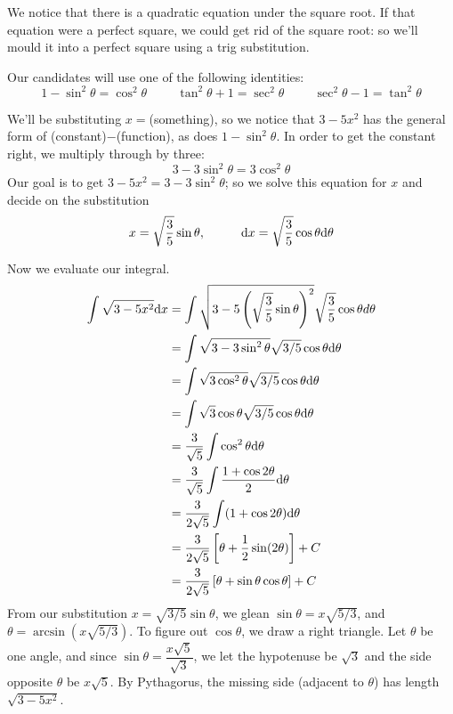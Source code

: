 \begin{solution}

We notice that there is a quadratic equation under the square root. If that equation were a perfect square, we could get rid of the square root: so we'll mould it into a perfect square using a trig substitution.

Our candidates will use one of the following identities:
\[1-\sin^2\theta=\cos^2\theta \hspace{1cm} \tan^2\theta+1=\sec^2\theta \hspace{1cm} \sec^2\theta-1=\tan^2\theta\]

We'll be substituting $x=$(something), so we notice that $3-5x^2$ has the general form of
(constant)$-$(function), as does $1-\sin^2\theta$. In order to get the constant right, we multiply through by three:
\[3-3\sin^2\theta = 3\cos^2\theta\]
Our goal is to get $3-5x^2=3-3\sin^2\theta$; so we solve this equation for $x$ and decide on the substitution
\[x=\sqrt{\frac{3}{5}}\sin\theta,\hspace{1cm}
\mathrm{d}x=\sqrt{\frac{3}{5}}\cos\theta \mathrm{d}\theta\]

Now we evaluate our integral.
\begin{align*}
\int\sqrt{3-5x^2}\mathrm{d}x&=\int\sqrt{3-5\left( \sqrt{\frac{3}{5}}\sin\theta\right)^2}\sqrt{\frac{3}{5}}\cos\theta d \theta\\
&=\int
\sqrt{3-3\sin^2\theta}\sqrt{3/5}\cos\theta
\mathrm{d}\theta\\
&=\int
\sqrt{3\cos^2\theta}\sqrt{3/5}\cos\theta
\mathrm{d}\theta\\
&=\int
\sqrt{3}\cos\theta\sqrt{3/5}\cos\theta
\mathrm{d}\theta\\
&=\frac{3}{\sqrt{5}}\int
\cos^2\theta
\mathrm{d}\theta\\
&=\frac{3}{\sqrt{5}}\int
\frac{1+\cos 2\theta}{2}
\mathrm{d}\theta\\
&=\frac{3}{2\sqrt{5}}\int
(1+\cos2\theta)
\mathrm{d}\theta\\
&=
\frac{3}{2\sqrt{5}}\left[
\theta+\frac{1}{2}\sin(2\theta)
\right]+C\\
&=\frac{3}{2\sqrt{5}}\left[
\theta + \sin\theta\cos\theta
\right]+C
\end{align*}
From our substitution $x=\sqrt{3/5}\sin\theta$, we glean $\sin\theta = x\sqrt{5/3}$, and $\theta = \arcsin \left(x\sqrt{5/3} \right)$. To figure out $\cos\theta$, we draw a right triangle. Let $\theta$ be one angle, and since $\sin\theta = \dfrac{x\sqrt{5}}{\sqrt{3}}$, we let the hypotenuse be $\sqrt{3}$ and the side opposite $\theta$ be $x\sqrt{5}$. By Pythagorus, the missing side (adjacent to $\theta$) has length $\sqrt{3-5x^2}$.


\end{solution}
